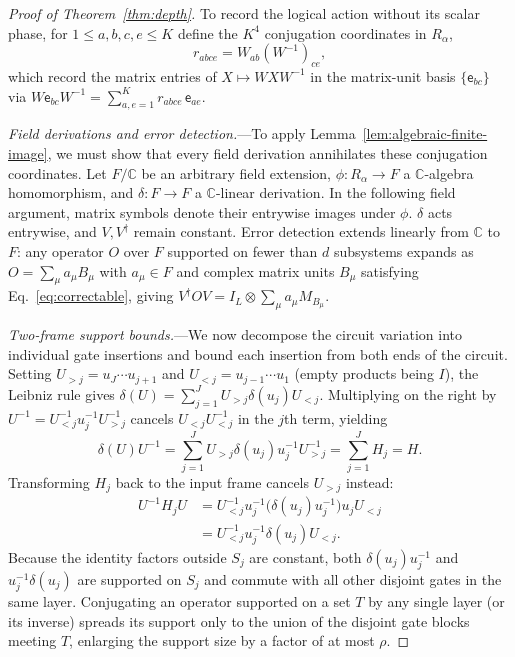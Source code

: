 \documentclass[aps,prl,reprint,notitlepage,nofootinbib,nobibnotes]{revtex4-2}
\newcommand{\id}{I}
\begin{document}
\begin{proof}[Proof of Theorem~\ref{thm:depth}]
To record the logical action without its scalar phase, for $1\le a,b,c,e\le K$ define the $K^4$
conjugation coordinates in $R_\alpha$,
\begin{equation}\label{eq:conjugation-coordinates}
 r_{abce}=W_{ab}(W^{-1})_{ce},
\end{equation}
which record the matrix entries of $X\mapsto WXW^{-1}$ in the matrix-unit basis $\{\mathsf
e_{bc}\}$ via $W\mathsf e_{bc}W^{-1}=\sum_{a,e=1}^{K}r_{abce}\,\mathsf e_{ae}$.

\emph{Field derivations and error detection.}---To apply Lemma~\ref{lem:algebraic-finite-image}, we
must show that every field derivation annihilates these conjugation coordinates. Let $F/\mathbb C$
be an arbitrary field extension, $\phi:R_\alpha\to F$ a $\mathbb C$-algebra homomorphism, and
$\delta:F\to F$ a $\mathbb C$-linear derivation. In the following field argument, matrix symbols
denote their entrywise images under $\phi$. $\delta$ acts entrywise, and $V,V^\dagger$ remain
constant. Error detection extends linearly from $\mathbb C$ to $F$: any operator $O$ over $F$
supported on fewer than $d$ subsystems expands as $O=\sum_\mu a_\mu B_\mu$ with $a_\mu\in F$ and
complex matrix units $B_\mu$ satisfying Eq.~\eqref{eq:correctable}, giving $V^\dagger
OV=\id_L\otimes\sum_\mu a_\mu M_{B_\mu}$.

\emph{Two-frame support bounds.}---We now decompose the circuit variation into individual gate
insertions and bound each insertion from both ends of the circuit. Setting $U_{>j}=u_J\cdots
u_{j+1}$ and $U_{<j}=u_{j-1}\cdots u_1$ (empty products being $\id$), the Leibniz rule gives
$\delta(U)=\sum_{j=1}^J U_{>j}\delta(u_j)U_{<j}$. Multiplying on the right by
$U^{-1}=U_{<j}^{-1}u_j^{-1}U_{>j}^{-1}$ cancels $U_{<j}U_{<j}^{-1}$ in the $j$th term, yielding
\begin{equation}\label{eq:generator}
 \delta(U)U^{-1}=\sum_{j=1}^JU_{>j}\delta(u_j)u_j^{-1}U_{>j}^{-1}=\sum_{j=1}^J H_j=H.
\end{equation}
Transforming $H_j$ back to the input frame cancels $U_{>j}$ instead:
\[
 \begin{aligned}
 U^{-1}H_jU
 &=U_{<j}^{-1}u_j^{-1}\bigl(\delta(u_j)u_j^{-1}\bigr)u_jU_{<j}\\
 &=U_{<j}^{-1}u_j^{-1}\delta(u_j)U_{<j}.
 \end{aligned}
\]
Because the identity factors outside $S_j$ are constant, both $\delta(u_j)u_j^{-1}$ and
$u_j^{-1}\delta(u_j)$ are supported on $S_j$ and commute with all other disjoint gates in the same
layer. Conjugating an operator supported on a set $T$ by any single layer (or its inverse) spreads
its support only to the union of the disjoint gate blocks meeting $T$, enlarging the support size
by a factor of at most $\rho$.


\end{proof}
\end{document}

